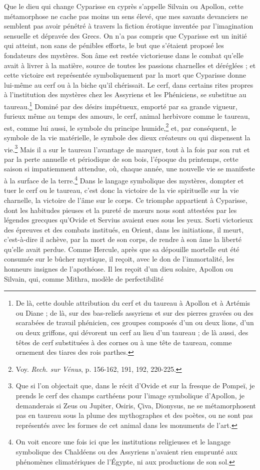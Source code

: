 \documentclass{article}
\begin{document}
Que le dieu qui change Cyparisse en cyprès s'appelle Silvain ou Apollon, cette métamorphose ne cache pas moins un sens élevé, que mes savants devanciers ne semblent pas avoir pénétré à travers la fiction érotique inventée par l'imagination sensuelle et dépravée des Grecs. On n'a pas compris que Cyparisse est un initié qui atteint, non sans de pénibles efforts, le but que s'étaient proposé les fondateurs des mystères. Son âme est restée victorieuse dans le combat qu'elle avait à livrer à la matière, source de toutes les passions charnelles et déréglées ; et cette victoire est représentée symboliquement par la mort que Cyparisse donne lui-même au cerf ou à la biche qu'il chérissait. Le cerf, dans certains rites propres à l'institution des mystères chez les Assyriens et les Phéniciens, se substitue au taureau.\footnote{De là, cette double attribution du cerf et du taureau à Apollon et à Artémis ou Diane ; de là, sur des bas-reliefs assyriens et sur des pierres gravées ou des scarabées de travail phénicien, ces groupes composés d'un ou deux lions, d'un ou deux griffons, qui dévorent un cerf au lieu d'un taureau ; de là aussi, des têtes de cerf substituées à des cornes ou à une tête de taureau, comme ornement des tiares des rois parthes.} Dominé par des désirs impétueux, emporté par sa grande vigueur, furieux même au temps des amours, le cerf, animal herbivore comme le taureau, est, comme lui aussi, le symbole du principe humide,\footnote{Voy. \emph{Rech. sur Vénus}, p. 156-162, 191, 192, 220-225.} et, par conséquent, le symbole de la vie matérielle, le symbole des dieux créateurs ou qui dispensent la vie.\footnote{Que si l'on objectait que, dans le récit d'Ovide et sur la fresque de Pompeï, je prends le cerf des champs carthéens pour l'image symbolique d'Apollon, je demanderais si Zeus ou Jupiter, Osiris, Çiva, Dionysus, ne se métamorphosent pas en taureau sous la plume des mythographes et des poètes, ou ne sont pas représentés avec les formes de cet animal dans les monuments de l'art.} Mais il a sur le taureau l'avantage de marquer, tout à la fois par son rut et par la perte annuelle et périodique de son bois, l'époque du printemps, cette saison si impatiemment attendue, où, chaque année, une nouvelle vie se manifeste à la surface de la terre.\footnote{On voit encore une fois ici que les institutions religieuses et le langage symbolique des Chaldéens ou des Assyriens n'avaient rien emprunté aux phénomènes climatériques de l'Égypte, ni aux productions de son sol.} Dans le langage symbolique des mystères, dompter et tuer le cerf ou le taureau, c'est donc la victoire de la vie spirituelle sur la vie charnelle, la victoire de l'âme sur le corps. Ce triomphe appartient à Cyparisse, dont les habitudes pieuses et la pureté de mœurs nous sont attestées par les légendes grecques qu'Ovide et Servius avaient eues sous les yeux. Sorti victorieux des épreuves et des combats institués, en Orient, dans les initiations, il meurt, c'est-à-dire il achève, par la mort de son corps, de rendre à son âme la liberté qu'elle avait perdue. Comme Hercule, après que sa dépouille mortelle eut été consumée sur le bûcher mystique, il reçoit, avec le don de l'immortalité, les honneurs insignes de l'apothéose. Il les reçoit d'un dieu solaire, Apollon ou Silvain, qui, comme Mithra, modèle de perfectibilité 
\end{document}
